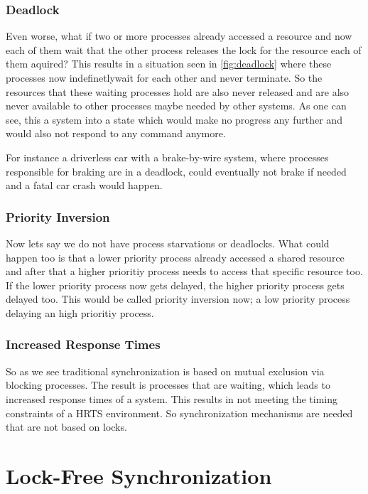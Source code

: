 \subsubsection{Deadlock}\label{subsubsec:deadlock}

Even worse, what if two or more processes already accessed a resource and now each of them wait that the other process releases the lock for the resource each of them aquired? This results in a situation  seen in \cref{fig:deadlock} where these processes now indefinetlywait for each other and never terminate. So the resources that these waiting processes hold are also never released and are also never available to other processes maybe needed by other systems. As one can see, this a system into a state which would make no progress any further and would also not respond to any command anymore. \cite{Deadlock,chahar2013deadlock}

For instance a driverless car with a brake-by-wire system, where processes responsible for braking are in a deadlock, could eventually not brake if needed and a fatal car crash would happen. 


\subsubsection{Priority Inversion}\label{subsubsec:priority-inversion}

Now lets say we do not have process starvations or deadlocks. What could happen too is that a lower priority process already accessed a shared resource and after that a higher prioritiy process needs to access that specific resource too. If the lower priority process now gets delayed, the higher priority process gets delayed too. This would be called priority inversion now; a low priority process delaying an high prioritiy process. \cite{priorityInversion}

\subsubsection{Increased Response Times}\label{subsubsec:increased-response-times}

So as we see traditional synchronization is based on mutual exclusion via blocking processes. The result is processes that are waiting, which leads to increased response times of a system. This results in not meeting the timing constraints of a \ac{HRTS} environment. So synchronization mechanisms are needed that are not based on locks.

\section{Lock-Free Synchronization}\label{sec:lock-free}

